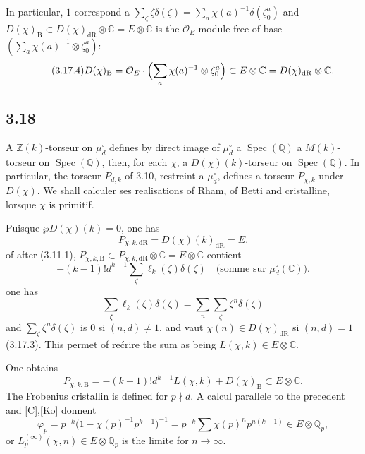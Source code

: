 \documentclass[12pt,a4paper]{article}
\theoremstyle{plain}
\theoremstyle{definition}
\theoremstyle{remark}
\DeclareMathOperator{\Spec}{Spec}
\newcommand{\DR}{\mathrm{dR}}
\newcommand{\B}{\mathrm{B}}
\newcommand{\OO}{\mathcal{O}}
\newcommand{\Z}{\mathbb{Z}}
\newcommand{\Q}{\mathbb{Q}}
\newcommand{\C}{\mathbb{C}}
\begin{document}
In particular, $1$ correspond a $\sum_\zeta \zeta\delta(\zeta) = \sum_a \chi(a)^{-1}\delta(\zeta_0^a)$ and $D(\chi)_{\B} \subset D(\chi)_{\DR} \otimes \C = E \otimes \C$ is the $\OO_E$-module free of base $(\sum_a \chi(a)^{-1} \otimes \zeta_0^a)$:
\begin{equation*}\tag{3.17.4}
D(\chi)_{\B} = \OO_E \cdot \Bigl(\sum_a \chi(a)^{-1} \otimes \zeta_0^a\Bigr) \subset E \otimes \C = D(\chi)_{\DR} \otimes \C.
\end{equation*}

\subsection*{3.18}

A $\Z(k)$-torseur on $\mu_d^\circ$ defines by direct image of $\mu_d^\circ$ a $\Spec(\Q)$ a $M(k)$-torseur on $\Spec(\Q)$, then, for each $\chi$, a $D(\chi)(k)$-torseur on $\Spec(\Q)$. In particular, the torseur $P_{d,k}$ of 3.10, restreint a $\mu_d^\circ$, defines a torseur $P_{\chi,k}$ under $D(\chi)$. We shall calculer ses realisations of Rham, of Betti and cristalline, lorsque $\chi$ is primitif.

Puisque $\wp D(\chi)(k) = 0$, one has
\begin{equation*}\tag{3.18.1}
P_{\chi,k,\DR} = D(\chi)(k)_{\DR} = E.
\end{equation*}
of after (3.11.1), $P_{\chi,k,\B} \subset P_{\chi,k,\DR} \otimes \C = E \otimes \C$ contient
\[
-(k-1)!d^{k-1} \sum_\zeta \ell_k(\zeta)\delta(\zeta) \quad \text{(somme sur } \mu_d^\circ(\C)\text{)}.
\]
one has
\[
\sum_\zeta \ell_k(\zeta)\delta(\zeta) = \sum_n \sum_\zeta \zeta^n \delta(\zeta)
\]
and $\sum_\zeta \zeta^n\delta(\zeta)$ is $0$ si $(n,d) \neq 1$, and vaut $\chi(n) \in D(\chi)_{\DR}$ si $(n,d)=1$ (3.17.3). This permet of re\'crire the sum as being $L(\chi,k) \in E \otimes \C$.

One obtains
\begin{equation*}\tag{3.18.2}
P_{\chi,k,\B} = -(k-1)!d^{k-1}L(\chi,k) + D(\chi)_{\B} \subset E \otimes \C.
\end{equation*}
The Frobenius cristallin is defined for $p \nmid d$. A calcul parallele to the precedent and [C],[Ko] donnent
\begin{equation*}\tag{3.18.3}
\varphi_p = p^{-k}\bigl(1 - \chi(p)^{-1}p^{k-1}\bigr)^{-1} = p^{-k}\sum \chi(p)^n p^{n(k-1)} \in E \otimes \Q_p,
\end{equation*}
or $L_p^{(\infty)}(\chi,n) \in E \otimes \Q_p$ is the limite for $n \to \infty$.
\end{document}

